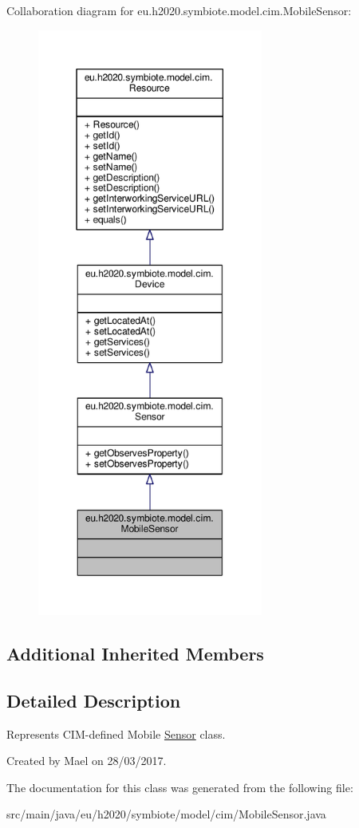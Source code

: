 Collaboration diagram for eu.\+h2020.\+symbiote.\+model.\+cim.\+Mobile\+Sensor\+:\nopagebreak
\begin{figure}[H]
\begin{center}
\leavevmode
\includegraphics[height=550pt]{classeu_1_1h2020_1_1symbiote_1_1model_1_1cim_1_1MobileSensor__coll__graph}
\end{center}
\end{figure}
\subsection*{Additional Inherited Members}


\subsection{Detailed Description}
Represents C\+I\+M-\/defined Mobile \hyperlink{classeu_1_1h2020_1_1symbiote_1_1model_1_1cim_1_1Sensor}{Sensor} class.

Created by Mael on 28/03/2017. 

The documentation for this class was generated from the following file\+:\begin{DoxyCompactItemize}
\item 
src/main/java/eu/h2020/symbiote/model/cim/Mobile\+Sensor.\+java\end{DoxyCompactItemize}
